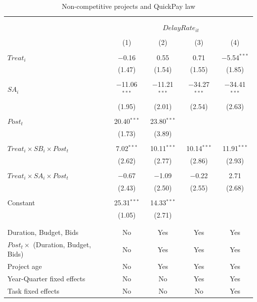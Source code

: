 \documentclass[
]{article}
\begin{document}
\begin{table}[H] \centering 
  \caption{Non-competitive projects and QuickPay law} 
  \label{} 
\small 
\begin{tabular}{@{\extracolsep{-2pt}}lcccc} 
\\[-1.8ex]\hline 
\hline \\[-1.8ex] 
\\[-1.8ex] & \multicolumn{4}{c}{$DelayRate_{it}$  } \\ 
\\[-1.8ex] & (1) & (2) & (3) & (4)\\ 
\hline \\[-1.8ex] 
 $Treat_i$ & $-$0.16 & 0.55 & 0.71 & $-$5.54$^{***}$ \\ 
  & (1.47) & (1.54) & (1.55) & (1.85) \\ 
  & & & & \\ 
 $SA_i$ & $-$11.06$^{***}$ & $-$11.21$^{***}$ & $-$34.27$^{***}$ & $-$34.41$^{***}$ \\ 
  & (1.95) & (2.01) & (2.54) & (2.63) \\ 
  & & & & \\ 
 $Post_t$ & 20.40$^{***}$ & 23.80$^{***}$ &  &  \\ 
  & (1.73) & (3.89) &  &  \\ 
  & & & & \\ 
 $Treat_i \times SB_i \times Post_t$ & 7.02$^{***}$ & 10.11$^{***}$ & 10.14$^{***}$ & 11.91$^{***}$ \\ 
  & (2.62) & (2.77) & (2.86) & (2.93) \\ 
  & & & & \\ 
 $Treat_i \times SA_i \times Post_t$ & $-$0.67 & $-$1.09 & $-$0.22 & 2.71 \\ 
  & (2.43) & (2.50) & (2.55) & (2.68) \\ 
  & & & & \\ 
 Constant & 25.31$^{***}$ & 14.33$^{***}$ &  &  \\ 
  & (1.05) & (2.71) &  &  \\ 
  & & & & \\ 
\hline \\[-1.8ex] 
Duration, Budget, Bids & No & Yes & Yes & Yes \\ 
$Post_t \times $  (Duration, Budget, Bids) & No & Yes & Yes & Yes \\ 
Project age & No & Yes & Yes & Yes \\ 
Year-Quarter fixed effects & No & No & Yes & Yes \\ 
Task fixed effects & No & No & No & Yes \\ 

\end{tabular}
\end{table}
\end{document}
